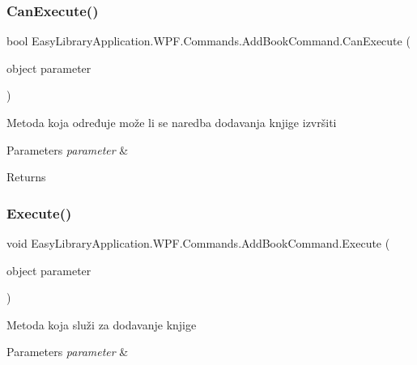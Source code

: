 \subsubsection{\texorpdfstring{Can\+Execute()}{CanExecute()}}
{\footnotesize\ttfamily bool Easy\+Library\+Application.\+W\+P\+F.\+Commands.\+Add\+Book\+Command.\+Can\+Execute (\begin{DoxyParamCaption}\item[{object}]{parameter }\end{DoxyParamCaption})}



Metoda koja određuje može li se naredba dodavanja knjige izvršiti 


\begin{DoxyParams}{Parameters}
{\em parameter} & \\
\hline
\end{DoxyParams}
\begin{DoxyReturn}{Returns}

\end{DoxyReturn}
\mbox{\label{class_easy_library_application_1_1_w_p_f_1_1_commands_1_1_add_book_command_ade8f62a72da7914cfc8b47d0e20ca88c}} 
\subsubsection{\texorpdfstring{Execute()}{Execute()}}
{\footnotesize\ttfamily void Easy\+Library\+Application.\+W\+P\+F.\+Commands.\+Add\+Book\+Command.\+Execute (\begin{DoxyParamCaption}\item[{object}]{parameter }\end{DoxyParamCaption})}



Metoda koja služi za dodavanje knjige 


\begin{DoxyParams}{Parameters}
{\em parameter} & \\
\hline
\end{DoxyParams}


